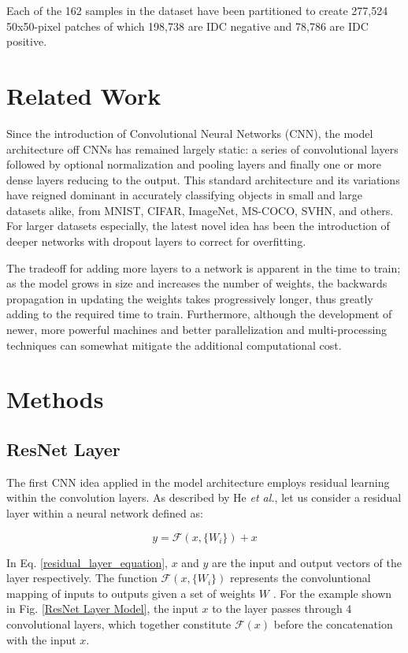 \documentclass[conference]{IEEEtran}
\begin{document}
Each of the 162 samples in the dataset have been partitioned to create 277,524 50x50-pixel patches of which 198,738 are IDC negative and 78,786 are IDC positive. 

\section{Related Work}
Since the introduction of Convolutional Neural Networks (CNN), the model architecture off CNNs has remained largely static: a series of convolutional layers followed by optional normalization and pooling layers and finally one or more dense layers reducing to the output. This standard architecture and its variations have reigned dominant in accurately classifying objects in small and large datasets alike, from MNIST, CIFAR, ImageNet, MS-COCO, SVHN, and others. For larger datasets especially, the latest novel idea has been the introduction of deeper networks with dropout layers to correct for overfitting.

The tradeoff for adding more layers to a network is apparent in the time to train; as the model grows in size and increases the number of weights, the backwards propagation in updating the weights takes progressively longer, thus greatly adding to the required time to train. Furthermore, although the development of newer, more powerful machines and better parallelization and multi-processing techniques can somewhat mitigate the additional computational cost.
\section{Methods}
\subsection{ResNet Layer}
The first CNN idea applied in the model architecture employs residual learning within the convolution layers. As described by He \textit{et al.}, let us consider a residual layer within a neural network defined as:

\begin{equation}
y = \mathcal{F} \left(x,\{W_i\}\right) + x
\label{residual_layer_equation}
\end{equation}

In Eq. \ref{residual_layer_equation}, $x$ and $y$ are the input and output vectors of the layer respectively. The function $\mathcal{F} \left(x,\{W_i\}\right)$ represents the convoluntional mapping of inputs to outputs given a set of weights $W$ \cite{He2016}. For the example shown in Fig. \ref{ResNet Layer Model}, the input $x$ to the layer passes through 4 convolutional layers, which together constitute $\mathcal{F}(x)$ before the concatenation with the input $x$.
\end{document}
